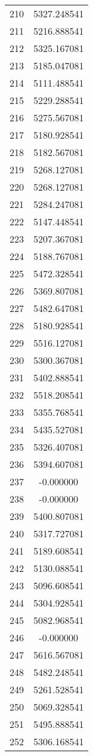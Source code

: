 \documentclass[12pt]{article}
\begin{document}
\begin{longtable}{@{}cc@{}}
210 & 5327.248541 \\
211 & 5216.888541 \\
212 & 5325.167081 \\
213 & 5185.047081 \\
214 & 5111.488541 \\
215 & 5229.288541 \\
216 & 5275.567081 \\
217 & 5180.928541 \\
218 & 5182.567081 \\
219 & 5268.127081 \\
220 & 5268.127081 \\
221 & 5284.247081 \\
222 & 5147.448541 \\
223 & 5207.367081 \\
224 & 5188.767081 \\
225 & 5472.328541 \\
226 & 5369.807081 \\
227 & 5482.647081 \\
228 & 5180.928541 \\
229 & 5516.127081 \\
230 & 5300.367081 \\
231 & 5402.888541 \\
232 & 5518.208541 \\
233 & 5355.768541 \\
234 & 5435.527081 \\
235 & 5326.407081 \\
236 & 5394.607081 \\
237 & -0.000000 \\
238 & -0.000000 \\
239 & 5400.807081 \\
240 & 5317.727081 \\
241 & 5189.608541 \\
242 & 5130.088541 \\
243 & 5096.608541 \\
244 & 5304.928541 \\
245 & 5082.968541 \\
246 & -0.000000 \\
247 & 5616.567081 \\
248 & 5482.248541 \\
249 & 5261.528541 \\
250 & 5069.328541 \\
251 & 5495.888541 \\
252 & 5306.168541 \\

\end{longtable}
\end{document}
